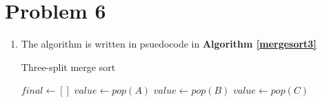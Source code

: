 \documentclass{article}
\begin{document}
\section{Problem 6}
\begin{enumerate}[label=\alph*.]
    \item The algorithm is written in psuedocode in \textbf{Algorithm \ref{mergesort3}}
    \begin{algorithm}
        \caption{Three-split merge sort}
        \label{mergesort3}
        \begin{algorithmic}[1] %
             
                \State $final \gets []$ 
                        \State $value \gets pop(A)$ 
                        \State $value \gets pop(B)$
                    \Else {}
                        \State $value \gets pop(C)$
                    \EndIf


\end{algorithmic}
\end{algorithm}
\end{enumerate}
\end{document}
